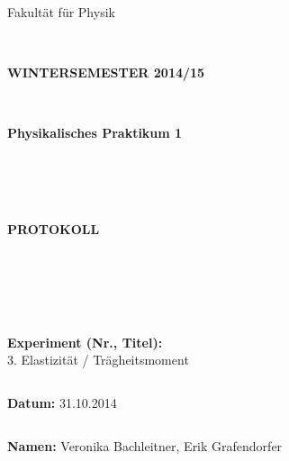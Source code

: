 \documentclass{article}
\begin{document}
\thispagestyle{empty}
			\begin{center}
			\Large{Fakultät für Physik}\\
			\end{center}
\begin{verbatim}


\end{verbatim}
			\begin{center}
			\textbf{\LARGE WINTERSEMESTER 2014/15}
			\end{center}
\begin{verbatim}


\end{verbatim}
			\begin{center}
			\textbf{\LARGE{Physikalisches Praktikum 1}}
			\end{center}
\begin{verbatim}




\end{verbatim}

			\begin{center}
			\textbf{\LARGE{PROTOKOLL}}
			\end{center}
			
\begin{verbatim}





\end{verbatim}

			\begin{flushleft}
			\textbf{\Large{Experiment (Nr., Titel):}}\\
			\LARGE{3. Elastizität / Trägheitsmoment}	
			\end{flushleft}

\begin{verbatim}

\end{verbatim}	
			\begin{flushleft}
			\textbf{\Large{Datum:}} \Large{31.10.2014}
			\end{flushleft}
			
\begin{verbatim}
\end{verbatim}
		\begin{flushleft}
			\textbf{\Large{Namen:}} \Large{Veronika Bachleitner, Erik Grafendorfer}
			\end{flushleft}
\end{document}
